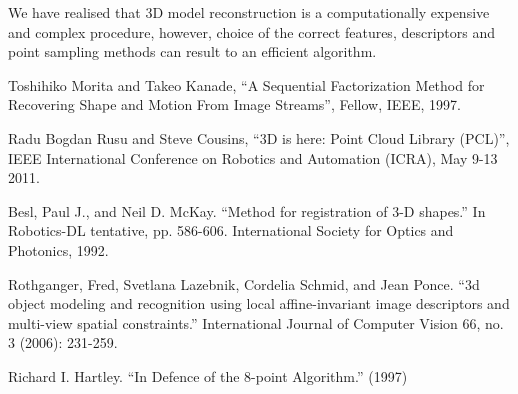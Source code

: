 \documentclass[11pt,twocolumn]{article}
\begin{document}
We have realised that 3D model reconstruction is a computationally expensive and complex procedure, however, choice of the correct features, descriptors and point sampling methods can result to an efficient algorithm. 
\label{conclusion}


\begin{thebibliography}{9}

Toshihiko Morita and Takeo Kanade, ``A Sequential Factorization Method for Recovering Shape and Motion From Image Streams'', Fellow, IEEE, 1997.

Radu Bogdan Rusu and Steve Cousins, ``3D is here: Point Cloud Library (PCL)'', IEEE International Conference on Robotics and Automation (ICRA), May 9-13 2011.


Besl, Paul J., and Neil D. McKay. ``Method for registration of 3-D shapes.'' In Robotics-DL tentative, pp. 586-606. International Society for Optics and Photonics, 1992.

Rothganger, Fred, Svetlana Lazebnik, Cordelia Schmid, and Jean Ponce. ``3d object modeling and recognition using local affine-invariant image descriptors and multi-view spatial constraints.'' International Journal of Computer Vision 66, no. 3 (2006): 231-259.

Richard I. Hartley. ``In Defence of the 8-point Algorithm.'' (1997)


\end{thebibliography}
\end{document}
